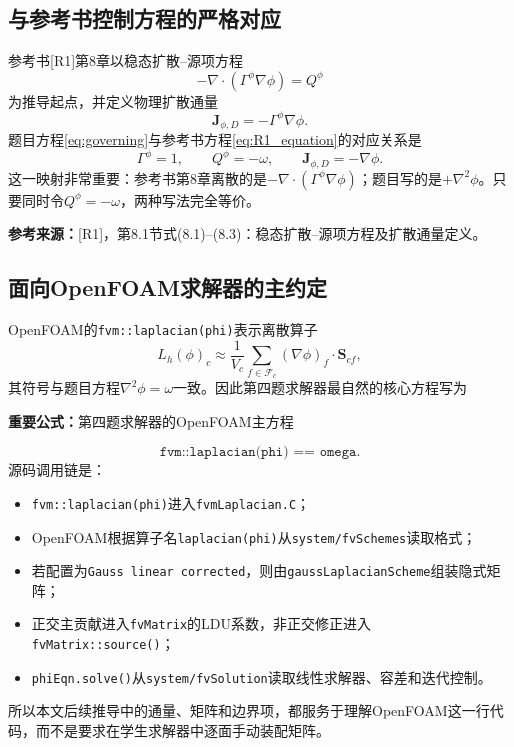 \documentclass[UTF8,12pt,a4paper]{ctexart}
\numberwithin{equation}{section}
\newcommand{\Rone}{\textnormal{[R1]}}
\newcommand{\source}[1]{%
  \par\smallskip
  \noindent\colorbox{sourcebg}{%
    \parbox{0.955\linewidth}{\footnotesize\color{sourcegray}\textbf{参考来源：}#1}%
  }
  \par\smallskip
}
\newcommand{\keytitle}[1]{%
  \par\smallskip\noindent
  \colorbox{keybg}{\parbox{0.965\linewidth}{\color{keyblue}\textbf{重要公式：}#1}}
  \par\smallskip
}
\begin{document}
\subsection*{与参考书控制方程的严格对应}

参考书\Rone 第8章以稳态扩散--源项方程
\begin{equation}
  -\nabla\cdot\left(\Gamma^\phi\nabla\phi\right)=Q^\phi
  \label{eq:R1_equation}
\end{equation}
为推导起点，并定义物理扩散通量
\begin{equation}
  \bm J_{\phi,D}=-\Gamma^\phi\nabla\phi.
  \label{eq:physical_diffusive_flux}
\end{equation}
题目方程\eqref{eq:governing}与参考书方程\eqref{eq:R1_equation}的对应关系是
\begin{equation}
  \boxed{
  \Gamma^\phi=1,
  \qquad
  Q^\phi=-\omega,
  \qquad
  \bm J_{\phi,D}=-\nabla\phi.}
  \label{eq:book_mapping}
\end{equation}
这一映射非常重要：参考书第8章离散的是$-\nabla\cdot(\Gamma^\phi\nabla\phi)$；题目写的是$+\nabla^2\phi$。只要同时令$Q^\phi=-\omega$，两种写法完全等价。

\source{\Rone，第8.1节式(8.1)--(8.3)：稳态扩散--源项方程及扩散通量定义。}

\subsection*{面向OpenFOAM求解器的主约定}

OpenFOAM的\texttt{fvm::laplacian(phi)}表示离散算子
\begin{equation}
  L_h(\phi)_c
  \approx
  \frac{1}{V_c}
  \sum_{f\in\mathcal F_c}
  (\nabla\phi)_f\cdot\bm S_{cf},
  \label{eq:foam_laplacian_operator}
\end{equation}
其符号与题目方程$\nabla^2\phi=\omega$一致。因此第四题求解器最自然的核心方程写为
\keytitle{第四题求解器的OpenFOAM主方程}
\begin{equation}
  \boxed{
  \texttt{fvm::laplacian(phi) == omega}.}
  \label{eq:foam_primary_equation}
\end{equation}
源码调用链是：
\begin{itemize}
  \item \texttt{fvm::laplacian(phi)}进入\texttt{fvmLaplacian.C}；
  \item OpenFOAM根据算子名\texttt{laplacian(phi)}从\texttt{system/fvSchemes}读取格式；
  \item 若配置为\texttt{Gauss linear corrected}，则由\texttt{gaussLaplacianScheme}组装隐式矩阵；
  \item 正交主贡献进入\texttt{fvMatrix}的LDU系数，非正交修正进入\texttt{fvMatrix::source()}；
  \item \texttt{phiEqn.solve()}从\texttt{system/fvSolution}读取线性求解器、容差和迭代控制。
\end{itemize}
所以本文后续推导中的通量、矩阵和边界项，都服务于理解OpenFOAM这一行代码，而不是要求在学生求解器中逐面手动装配矩阵。
\end{document}

